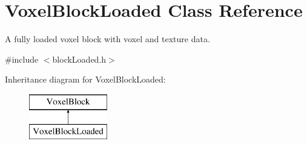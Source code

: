 \hypertarget{classVoxelBlockLoaded}{
\section{\-Voxel\-Block\-Loaded \-Class \-Reference}
\label{d0/df8/classVoxelBlockLoaded}
}


\-A fully loaded voxel block with voxel and texture data.  




{\ttfamily \#include $<$block\-Loaded.\-h$>$}

\-Inheritance diagram for \-Voxel\-Block\-Loaded\-:\begin{figure}[H]
\begin{center}
\leavevmode
\includegraphics[height=2.000000cm]{d0/df8/classVoxelBlockLoaded}
\end{center}
\end{figure}
